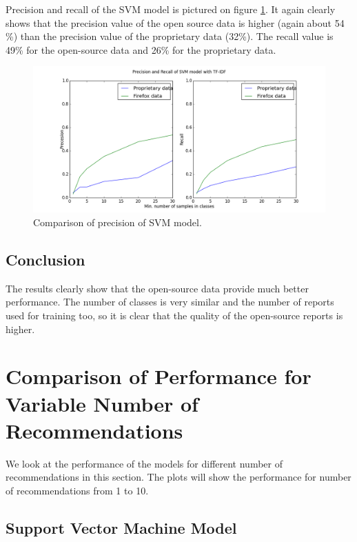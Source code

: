 Precision and recall of the SVM model is pictured on figure \ref{fig:results.datasets.svm_pr}. It again clearly shows that the precision value of the open source data is higher (again about 54 \%) than the precision value of the proprietary data (32\%). The recall value is 49\% for the open-source data and 26\% for the proprietary data.

\begin{figure}[htbp]
    \centering
        \includegraphics[width=\textwidth]{./images/prop_vs_os/svm_precision_and_recall.png}
    \caption{Comparison of precision of SVM model.}
    \label{fig:results.datasets.svm_pr}
\end{figure}

\subsection{Conclusion}

The results clearly show that the open-source data provide much better performance. The number of classes is very similar and the number of reports used for training too, so it is clear that the quality of the open-source reports is higher.

\section{Comparison of Performance for Variable Number of Recommendations}

We look at the performance of the models for different number of recommendations in this section. The plots will show the performance for number of recommendations from 1 to 10.

\subsection{Support Vector Machine Model}

